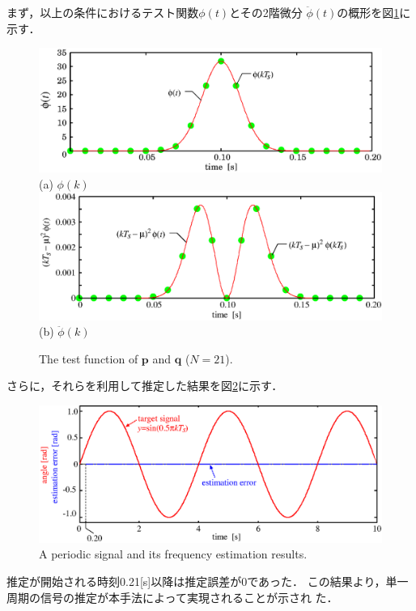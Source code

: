 \documentclass[usejistfm]{sice}
\begin{document}
まず，以上の条件におけるテスト関数$\phi(t)$とその2階微分
$\ddot{\phi}(t)$の概形を図\ref{fig:ddphi}に示す．
\begin{figure}[bp]
 \begin{center}
  \includegraphics[width=1.0\linewidth]{fig/phi2.eps}\\
  (a) $\phi(k)$\\
  \includegraphics[width=1.0\linewidth]{fig/ddphi2.eps}\\
  (b) $\ddot{\phi}(k)$
 \end{center}
 \caption{The test function of $\mathbf{p}$ and $\mathbf{q}$ ($N=21$).}
 \label{fig:ddphi}
\end{figure}
さらに，それらを利用して推定した結果を図\ref{fig:sim2}に示す．
\begin{figure}[btp]
 \begin{center}
  \includegraphics[width=1.0\linewidth]{fig/sim2.eps}
 \end{center}
 \caption{A periodic signal and its frequency estimation results.}
 \label{fig:sim2}
\end{figure}
推定が開始される時刻0.21[s]以降は推定誤差が0であった．
この結果より，単一周期の信号の推定が本手法によって実現されることが示され
た．
\end{document}

